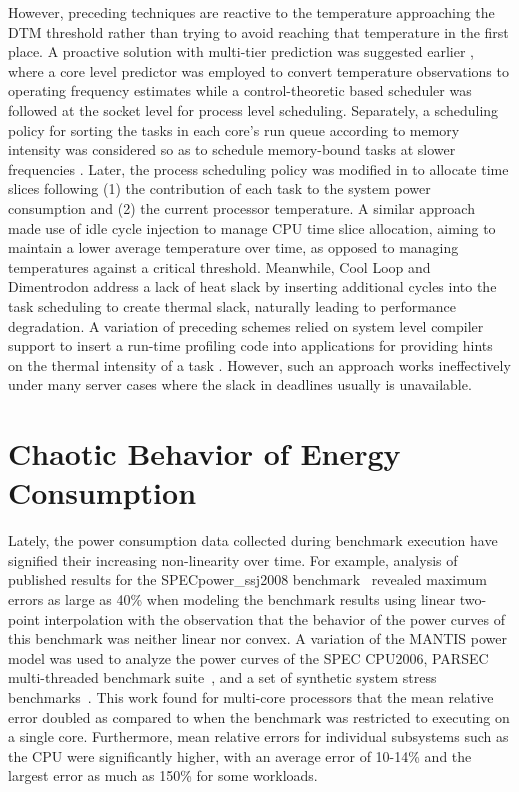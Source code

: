 However, preceding techniques are reactive to the temperature
approaching the DTM threshold rather than trying to avoid reaching that
temperature in the first place.  A proactive solution with multi-tier
prediction was suggested earlier \cite{Ayoub2011}, where a core level
predictor was employed to convert temperature observations to operating
frequency estimates while a control-theoretic based scheduler was
followed at the socket level for process level scheduling.  Separately,
a scheduling policy for sorting the tasks in each core's run queue
according to memory intensity was considered so as to schedule
memory-bound tasks at slower frequencies \cite{Merkel2008b,Merkel2010}.
Later, the process scheduling policy was modified in \cite{Bellosa2003}
to allocate time slices following (1) the contribution of each task to
the system power consumption and (2) the current processor temperature.
A similar approach made use of idle cycle injection to manage CPU time
slice allocation, aiming to maintain a lower average temperature over
time, as opposed to managing temperatures against a critical threshold.
Meanwhile, Cool Loop \cite{Choi2007} and Dimentrodon \cite{Bailis2011}
address a lack of heat slack by inserting additional cycles into the
task scheduling to create thermal slack, naturally leading to
performance degradation.  A variation of preceding schemes relied on
system level compiler support to insert a run-time profiling code into
applications for providing hints on the thermal intensity of a task
\cite{LiK2008}.  However, such an approach works ineffectively under
many server cases where the slack in deadlines usually is unavailable.

\section{Chaotic Behavior of Energy Consumption}
\label{sec:chaot-pred-energy}
Lately, the power consumption data collected during benchmark execution
have signified their increasing non-linearity over time. For example,
analysis of published results for the SPECpower\_ssj2008
benchmark~\cite{Varsampoulos2010,Hsu2011} revealed maximum errors as
large as 40\% when modeling the benchmark results using linear two-point
interpolation with the observation that the behavior of the power
curves of this benchmark was neither linear nor
convex.  A variation of the MANTIS power model \cite{Economou2006} was
used to analyze the power curves of the SPEC CPU2006, PARSEC
multi-threaded benchmark suite~\cite{Bienia2011}, and a set of synthetic
system stress benchmarks~\cite{McCullough2011}.  This work found for
multi-core processors that the mean relative error doubled as compared
to when the benchmark was restricted to executing on a single core.
Furthermore, mean relative errors for individual subsystems such as the
CPU were significantly higher, with an average error of 10-14\% and the
largest error as much as 150\% for some workloads.

